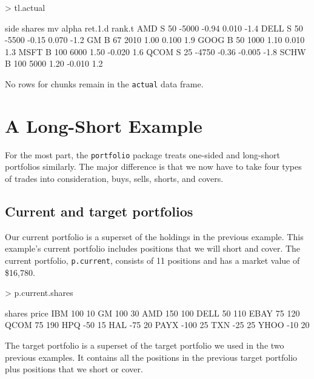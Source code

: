 \documentclass{article}
\begin{document}
\begin{Schunk}
\begin{Sinput}
> tl.actual
\end{Sinput}
\begin{Soutput}
     side shares    mv alpha ret.1.d rank.t
AMD     S     50 -5000 -0.94   0.010   -1.4
DELL    S     50 -5500 -0.15   0.070   -1.2
GM      B     67  2010  1.00   0.100    1.9
GOOG    B     50  1000  1.10   0.010    1.3
MSFT    B    100  6000  1.50  -0.020    1.6
QCOM    S     25 -4750 -0.36  -0.005   -1.8
SCHW    B    100  5000  1.20  -0.010    1.2
\end{Soutput}
\end{Schunk}

No rows for chunks remain in the \texttt{actual} data frame.

\section{A Long-Short Example}


For the most part, the \texttt{portfolio} package treats one-sided and
long-short portfolios similarly.  The major difference is that we now
have to take four types of trades into consideration, buys, sells,
shorts, and covers.

\subsection{Current and target portfolios}

Our current portfolio is a superset of the holdings in the previous
example.  This example's current portfolio includes positions that we
will short and cover.  The current portfolio, \texttt{p.current},
consists of 11 positions and has a market
value of \$16,780.


\begin{Schunk}
\begin{Sinput}
> p.current.shares
\end{Sinput}
\begin{Soutput}
     shares price
IBM     100    10
GM      100    30
AMD     150   100
DELL     50   110
EBAY     75   120
QCOM     75   190
HPQ     -50    15
HAL     -75    20
PAYX   -100    25
TXN     -25    25
YHOO    -10    20
\end{Soutput}
\end{Schunk}

The target portfolio is a superset of the target portfolio we used
in the two previous examples.  It contains all the positions in the
previous target portfolio plus positions that we short or cover.
\end{document}
